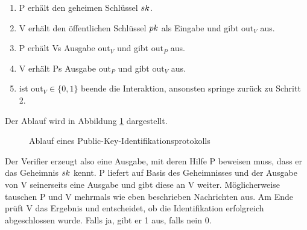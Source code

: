 \begin{enumerate}
  \item P erhält den geheimen Schlüssel $sk$.
  \item V erhält den öffentlichen Schlüssel $pk$ als Eingabe und
    gibt $\mathrm{out}_V$ aus.
  \item P erhält Vs Ausgabe $\mathrm{out}_V$ und gibt $\mathrm{out}_P$ aus.
  \item V erhält Ps Ausgabe $\mathrm{out}_P$ und gibt $\mathrm{out}_V$
    aus.
  \item ist $\mathrm{out}_V \in \{0,1\}$ beende die Interaktion,
    ansonsten springe zurück zu Schritt 2.
\end{enumerate} 

Der Ablauf wird in Abbildung \ref{fig:pki-identifikation} dargestellt.  

\begin{figure}[h]
\begin{center}
  \caption{Ablauf eines Public-Key-Identifikationsprotokolls}
  \label{fig:pki-identifikation}
\end{center}
\end{figure}


Der Verifier erzeugt also eine Ausgabe, mit deren Hilfe
P beweisen muss, dass er das Geheimnis $sk$ kennt. P liefert auf Basis
des Geheimnisses und der Ausgabe von V seinerseits eine Ausgabe und gibt
diese an V weiter. Möglicherweise tauschen P und V mehrmals wie eben
beschrieben Nachrichten aus. Am Ende prüft V das Ergebnis und
entscheidet, ob die Identifikation erfolgreich abgeschlossen wurde. Falls ja,
gibt er 1 aus, falls nein 0. 

